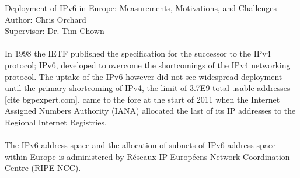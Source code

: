 \documentclass[pdflatex, a4paper,12pt]{article}
\begin{document}
\begin{center}
{\LARGE Deployment of IPv6 in Europe: Measurements, Motivations, and Challenges}\\[1em]

Author: Chris Orchard\\
Supervisor: Dr. Tim Chown
\end{center}

\paragraph{}

In 1998 the IETF published the specification for the successor to the IPv4
protocol; IPv6, developed to overcome the shortcomings of the IPv4 networking
protocol. The uptake of the IPv6 however did not see
widespread deployment until the primary shortcoming of IPv4, the limit of 3.7E9
total usable addresses [cite bgpexpert.com], came to the fore at the start of
2011 when the Internet Assigned Numbers Authority (IANA) allocated the last of
its IP addresses to the Regional Internet Registries. 

\paragraph{}

The IPv6 address space and the allocation of subnets of IPv6 address space
within Europe is administered by Réseaux IP Européens Network Coordination
Centre (RIPE NCC). 
\end{document}
